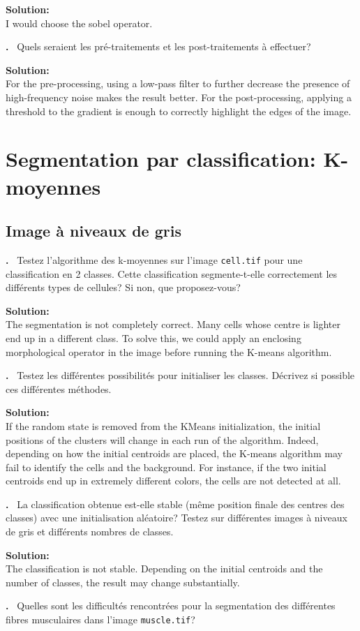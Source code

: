 \documentclass{article}
\newcounter{problem}
\newcounter{solution}
\newcommand\Problem{%
  \stepcounter{problem}%
  \textbf{\theproblem.}~%
  \setcounter{solution}{0}%
}
\newcommand\Solution{%
  \textbf{Solution:}\\%
}
\begin{document}
\Solution{I would choose the sobel operator.}

\Problem{Quels seraient les pré-traitements et les post-traitements à effectuer?}

\Solution{For the pre-processing, using a low-pass filter to further decrease the presence of high-frequency noise makes the result better.
For the post-processing, applying a threshold to the gradient is enough to correctly highlight the edges of the image.}

\section{Segmentation par classification: K-moyennes}

\subsection{Image à niveaux de gris}

\Problem{Testez l'algorithme des k-moyennes sur l'image \texttt{cell.tif} pour une classification en 2 classes.
Cette classification segmente-t-elle correctement les différents types de cellules? Si non, que proposez-vous?}

\Solution{The segmentation is not completely correct.
Many cells whose centre is lighter end up in a different class.
To solve this, we could apply an enclosing morphological operator in the image before running the K-means algorithm.}

\Problem{Testez les différentes possibilités pour initialiser les classes.
Décrivez si possible ces différentes méthodes.}

\Solution{If the random state is removed from the KMeans initialization, the initial positions of the clusters will change in each run of the algorithm.
Indeed, depending on how the initial centroids are placed, the K-means algorithm may fail to identify the cells and the background.
For instance, if the two initial centroids end up in extremely different colors, the cells are not detected at all.}

\Problem{La classification obtenue est-elle stable (même position finale des centres des classes) avec une initialisation aléatoire? Testez sur différentes images à niveaux de gris et différents nombres de classes.}

\Solution{The classification is not stable.
Depending on the initial centroids and the number of classes, the result may change substantially.}

\Problem{Quelles sont les difficultés rencontrées pour la segmentation des différentes fibres musculaires dans l'image \texttt{muscle.tif}?}
\end{document}

